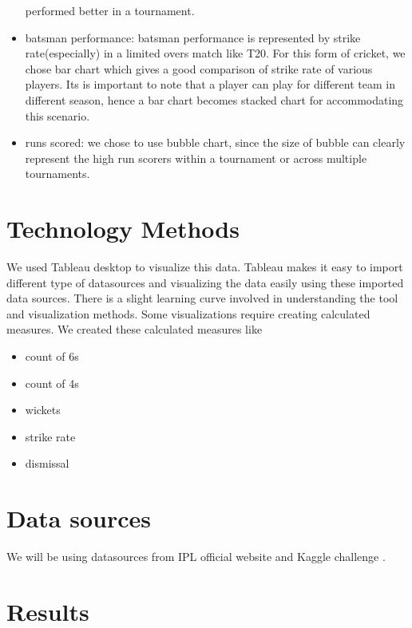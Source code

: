 \documentclass[sigconf]{acmart}
\begin{document}
\begin{itemize}
performed better in a tournament.
\item batsman performance: batsman performance is represented by strike rate(especially)
in a limited overs match like T20. For this form of cricket, we chose bar chart which gives 
a good comparison of strike rate of various players. Its is important to note that a player
can play for different team in different season, hence a bar chart becomes stacked chart for 
accommodating this scenario. 
\item runs scored: we chose to use bubble chart, since the size of bubble can clearly 
represent the high run scorers within a tournament or across multiple tournaments. 
\end{itemize}

\section{Technology Methods}
We used Tableau \cite{www-tableau} desktop to visualize this data. Tableau makes it easy to import different type
of datasources and visualizing the data easily using these imported data sources. There is a slight 
learning curve involved in understanding the tool and visualization methods. Some visualizations 
require creating calculated measures. We created these calculated measures like
\begin{itemize}
\item count of 6s
\item count of 4s
\item wickets
\item strike rate
\item dismissal
\end{itemize}

\section{Data sources}
We will be using datasources from IPL \cite{www-iplt20} official website
and Kaggle challenge \cite{www-kragle-iplc}.

\section{Results}
\end{document}

